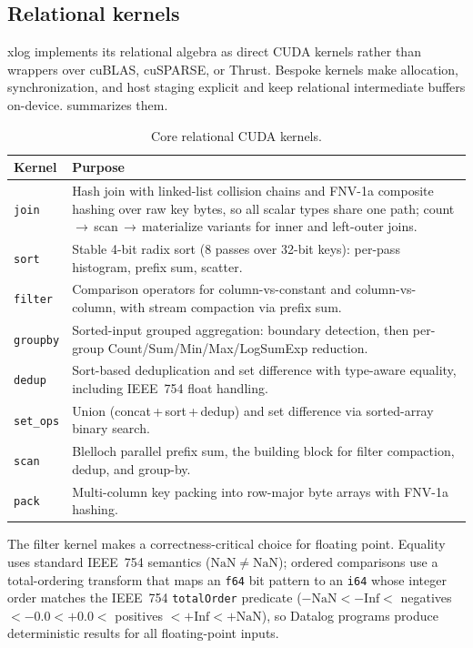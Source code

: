 \subsection{Relational kernels}

xlog implements its relational algebra as direct CUDA kernels rather than wrappers over cuBLAS, cuSPARSE, or Thrust. Bespoke kernels make allocation, synchronization, and host staging explicit and keep relational intermediate buffers on-device.  summarizes them.

\begin{table}[htbp]
  \centering
  \caption{Core relational CUDA kernels.}
  \label{tab:kernels}
  \small
  \begin{tabularx}{\linewidth}{@{}l L@{}}
    \toprule
    \textbf{Kernel} & \textbf{Purpose} \\
    \midrule
    \texttt{join}    & Hash join with linked-list collision chains and FNV-1a composite hashing over raw key bytes, so all scalar types share one path; count\,$\to$\,scan\,$\to$\,materialize variants for inner and left-outer joins. \\
    \texttt{sort}    & Stable 4-bit radix sort (8 passes over 32-bit keys): per-pass histogram, prefix sum, scatter. \\
    \texttt{filter}  & Comparison operators for column-vs-constant and column-vs-column, with stream compaction via prefix sum. \\
    \texttt{groupby} & Sorted-input grouped aggregation: boundary detection, then per-group Count/Sum/Min/Max/LogSumExp reduction. \\
    \texttt{dedup}   & Sort-based deduplication and set difference with type-aware equality, including IEEE~754 float handling. \\
    \texttt{set\_ops} & Union (concat\,+\,sort\,+\,dedup) and set difference via sorted-array binary search. \\
    \texttt{scan}    & Blelloch parallel prefix sum, the building block for filter compaction, dedup, and group-by. \\
    \texttt{pack}    & Multi-column key packing into row-major byte arrays with FNV-1a hashing. \\
    \bottomrule
  \end{tabularx}
\end{table}

The filter kernel makes a correctness-critical choice for floating point. Equality uses standard IEEE~754 semantics ($\mathrm{NaN}\neq\mathrm{NaN}$); ordered comparisons use a total-ordering transform that maps an \texttt{f64} bit pattern to an \texttt{i64} whose integer order matches the IEEE~754 \texttt{totalOrder} predicate ($-\mathrm{NaN} < -\mathrm{Inf} < $ negatives $< -0.0 < +0.0 <$ positives $< +\mathrm{Inf} < +\mathrm{NaN}$), so Datalog programs produce deterministic results for all floating-point inputs.


